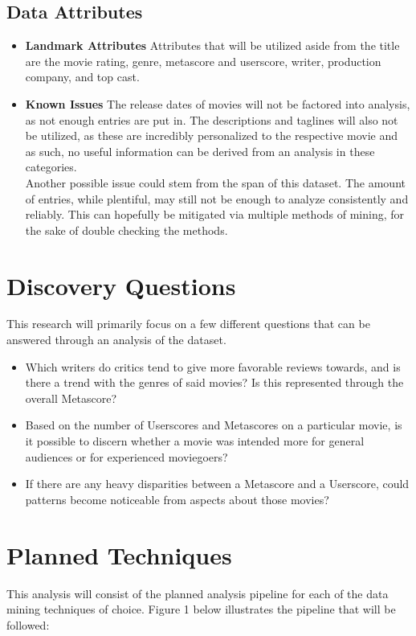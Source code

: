 \documentclass[conference]{IEEEtran}
\begin{document}
\subsection{Data Attributes}
\begin{itemize}
    \item \textbf{Landmark Attributes} Attributes that will be utilized aside from the title are the movie rating, genre, metascore and userscore, writer, production company, and top cast.
    \item \textbf{Known Issues} The release dates of movies will not be factored into analysis, as not enough entries are put in. The descriptions and taglines will also not be utilized, as these are incredibly personalized to the respective movie and as such, no useful information can be derived from an analysis in these categories. \\
    Another possible issue could stem from the span of this dataset. The amount of entries, while plentiful, may still not be enough to analyze consistently and reliably. This can hopefully be mitigated via multiple methods of mining, for the sake of double checking the methods.
\end{itemize}

\section{Discovery Questions}
This research will primarily focus on a few different questions that can be answered through an analysis of the dataset.
\begin{itemize}
    \item Which writers do critics tend to give more favorable reviews towards, and is there a trend with the genres of said movies? Is this represented through the overall Metascore?
    \item Based on the number of Userscores and Metascores on a particular movie, is it possible to discern whether a movie was intended more for general audiences or for experienced moviegoers?
    \item If there are any heavy disparities between a Metascore and a Userscore, could patterns become noticeable from aspects about those movies?
\end{itemize}

\section{Planned Techniques}
This analysis will consist of the planned analysis pipeline for each of the data mining techniques of choice. Figure 1 below illustrates the pipeline that will be followed:
\end{document}
